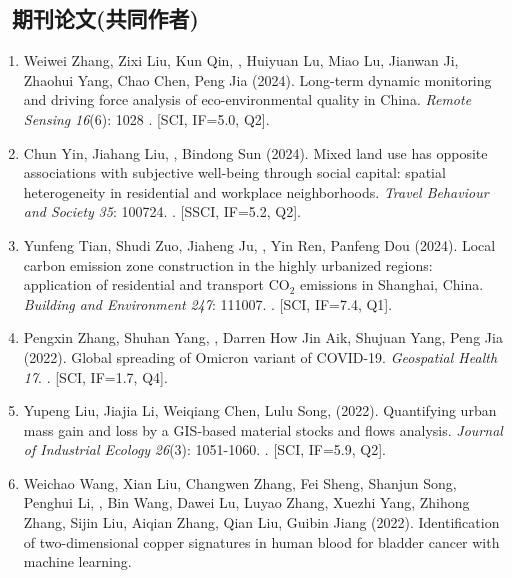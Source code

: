 \subsection*{\texorpdfstring{\faBook\ 期刊论文(共同作者)}{期刊论文(共同作者)}}
\begin{enumerate}
\item
    Weiwei Zhang, Zixi Liu, Kun Qin, \Shaoqing, Huiyuan Lu, Miao Lu, Jianwan Ji, Zhaohui Yang, Chao Chen, Peng Jia (2024).
    Long-term dynamic monitoring and driving force analysis of eco-environmental quality in China. 
    \textit{Remote Sensing} \textit{16}(6): 1028
    . [SCI, IF=5.0, Q2].
\item
    Chun Yin, Jiahang Liu, \Shaoqing, Bindong Sun (2024).
    Mixed land use has opposite associations with subjective well-being through social capital: spatial heterogeneity in residential and workplace neighborhoods.
    \textit{Travel Behaviour and Society} \textit{35}: 100724.
    . [SSCI, IF=5.2, Q2].
\item
    Yunfeng Tian, Shudi Zuo, Jiaheng Ju, \Shaoqing, Yin Ren, Panfeng Dou (2024).
    Local carbon emission zone construction in the highly urbanized regions: application of residential and transport CO$_2$ emissions in Shanghai, China.
    \textit{Building and Environment} \textit{247}: 111007.
    . [SCI, IF=7.4, Q1].
\item
    Pengxin Zhang, Shuhan Yang, \Shaoqing, Darren How Jin Aik, Shujuan Yang, Peng Jia (2022).
    Global spreading of Omicron variant of COVID-19.
    \textit{Geospatial Health} \textit{17}.
    . [SCI, IF=1.7, Q4].
\item
    Yupeng Liu, Jiajia Li, Weiqiang Chen, Lulu Song, \Shaoqing \enspace (2022).
    Quantifying urban mass gain and loss by a GIS‐based material stocks and flows analysis.
    \textit{Journal of Industrial Ecology} \textit{26}(3): 1051-1060.
    . [SCI, IF=5.9, Q2].
\item
    Weichao Wang, Xian Liu, Changwen Zhang, Fei Sheng, Shanjun Song, Penghui Li, \Shaoqing, Bin Wang, Dawei Lu, Luyao Zhang, Xuezhi Yang, Zhihong Zhang, Sijin Liu, Aiqian Zhang, Qian Liu, Guibin Jiang (2022).
    Identification of two-dimensional copper signatures in human blood for bladder cancer with machine learning.

\end{enumerate}
